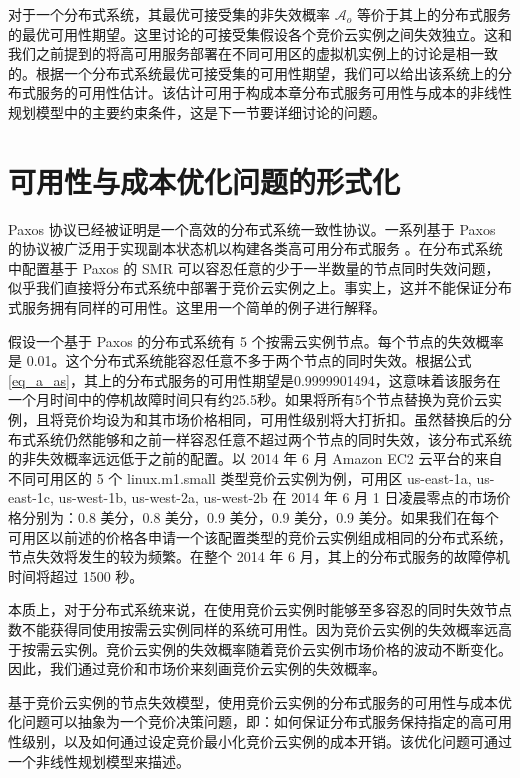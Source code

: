 对于一个分布式系统，其最优可接受集的非失效概率 $\mathcal{A}_{o}$ 等价于其上的分布式服务的最优可用性期望。这里讨论的可接受集假设各个竞价云实例之间失效独立。这和我们之前提到的将高可用服务部署在不同可用区的虚拟机实例上的讨论是相一致的。根据一个分布式系统最优可接受集的可用性期望，我们可以给出该系统上的分布式服务的可用性估计。该估计可用于构成本章分布式服务可用性与成本的非线性规划模型中的主要约束条件，这是下一节要详细讨论的问题。

\section{可用性与成本优化问题的形式化}
\label{jupiter-formulation}
Paxos \cite{lamport2001paxos}协议已经被证明是一个高效的分布式系统一致性协议。一系列基于 Paxos 的协议被广泛用于实现副本状态机以构建各类高可用分布式服务 \cite{Bolosky:2011:PRS:1972457.1972472, Burrows:2006:CLS:1298455.1298487, Mu:2014:PME:2600212.2600218}。在分布式系统中配置基于 Paxos 的 SMR 可以容忍任意的少于一半数量的节点同时失效问题，似乎我们直接将分布式系统中部署于竞价云实例之上。事实上，这并不能保证分布式服务拥有同样的可用性。这里用一个简单的例子进行解释。

假设一个基于 Paxos 的分布式系统有 5 个按需云实例节点。每个节点的失效概率是 0.01。这个分布式系统能容忍任意不多于两个节点的同时失效。根据公式\eqref{eq_a_as}，其上的分布式服务的可用性期望是0.9999901494，这意味着该服务在一个月时间中的停机故障时间只有约25.5秒。如果将所有5个节点替换为竞价云实例，且将竞价均设为和其市场价格相同，可用性级别将大打折扣。虽然替换后的分布式系统仍然能够和之前一样容忍任意不超过两个节点的同时失效，该分布式系统的非失效概率远远低于之前的配置。以 2014 年 6 月 Amazon EC2 云平台的来自不同可用区的 5 个 linux.m1.small 类型竞价云实例为例，可用区 us-east-1a, us-east-1c, us-west-1b, us-west-2a, us-west-2b 在 2014 年 6 月 1 日凌晨零点的市场价格分别为：0.8 美分，0.8 美分，0.9 美分，0.9 美分，0.9 美分。如果我们在每个可用区以前述的价格各申请一个该配置类型的竞价云实例组成相同的分布式系统，节点失效将发生的较为频繁。在整个 2014 年 6 月，其上的分布式服务的故障停机时间将超过 1500 秒。

本质上，对于分布式系统来说，在使用竞价云实例时能够至多容忍的同时失效节点数不能获得同使用按需云实例同样的系统可用性。因为竞价云实例的失效概率远高于按需云实例。竞价云实例的失效概率随着竞价云实例市场价格的波动不断变化。因此，我们通过竞价和市场价来刻画竞价云实例的失效概率。

基于竞价云实例的节点失效模型，使用竞价云实例的分布式服务的可用性与成本优化问题可以抽象为一个竞价决策问题，即：如何保证分布式服务保持指定的高可用性级别，以及如何通过设定竞价最小化竞价云实例的成本开销。该优化问题可通过一个非线性规划模型来描述。

